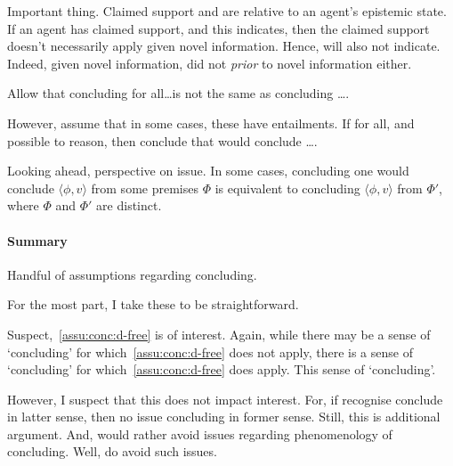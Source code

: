 \begin{note}
  \color{red}
  Important thing.
  Claimed support and  are relative to an agent's epistemic state.
  If an agent has claimed support, and this indicates, then the claimed support doesn't necessarily apply given novel information.
  Hence, will also not indicate.
  Indeed, given novel information, did not \indicateN{} \emph{prior} to novel information either.
\end{note}

\begin{note}
  Allow that concluding for all\dots is not the same as concluding \dots.

  However, assume that in some cases, these have entailments.
  If for all, and possible to reason, then conclude that would conclude \dots.
\end{note}

\begin{note}
  Looking ahead, perspective on issue.
  In some cases, concluding one would conclude \(\langle \phi,v \rangle\) from some premises \(\Phi\) is equivalent to concluding \(\langle \phi,v \rangle\) from \(\Phi'\), where \(\Phi\) and \(\Phi'\) are distinct.
\end{note}

\paragraph{Summary}

\begin{note}[Summary]
  Handful of assumptions regarding concluding.

  For the most part, I take these to be straightforward.

  Suspect,~\autoref{assu:conc:d-free} is of interest.
  Again, while there may be a sense of `concluding' for which~\autoref{assu:conc:d-free} does not apply, there is a sense of `concluding' for which~\autoref{assu:conc:d-free} does apply.
  This sense of `concluding'.

  However, I suspect that this does not impact interest.
  For, if recognise conclude in latter sense, then no issue concluding in former sense.
  Still, this is additional argument.
  And, would rather avoid issues regarding phenomenology of concluding.
  Well, do avoid such issues.
\end{note}

\subsection{}
\label{sec:csn2}

